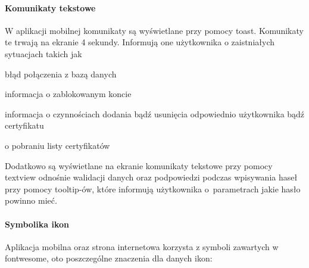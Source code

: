 \documentclass[twoside,10pt]{article}
\begin{document}
\paragraph*{Komunikaty tekstowe}
W aplikacji mobilnej komunikaty są wyświetlane przy pomocy toast. Komunikaty te  trwają na ekranie 4 sekundy. Informują one użytkownika o zaistniałych sytuacjach takich jak
\begin{itemize*}
\item błąd połączenia z bazą danych
\item informacja o zablokowanym koncie 
\item informacja o czynnościach dodania bądź usunięcia odpowiednio użytkownika bądź certyfikatu
\item o pobraniu listy certyfikatów
\end{itemize*}

Dodatkowo są wyświetlane na ekranie komunikaty tekstowe przy pomocy  textview odnośnie walidacji danych oraz podpowiedzi podczas wpisywania haseł przy pomocy tooltip-ów, które informują użytkownika o~parametrach jakie hasło powinno mieć.

\paragraph*{Symbolika ikon}\label{Symbolika ikon}
Aplikacja mobilna oraz strona internetowa korzysta z symboli zawartych w fontwesome, oto poszczególne znaczenia dla danych ikon:
\end{document}
